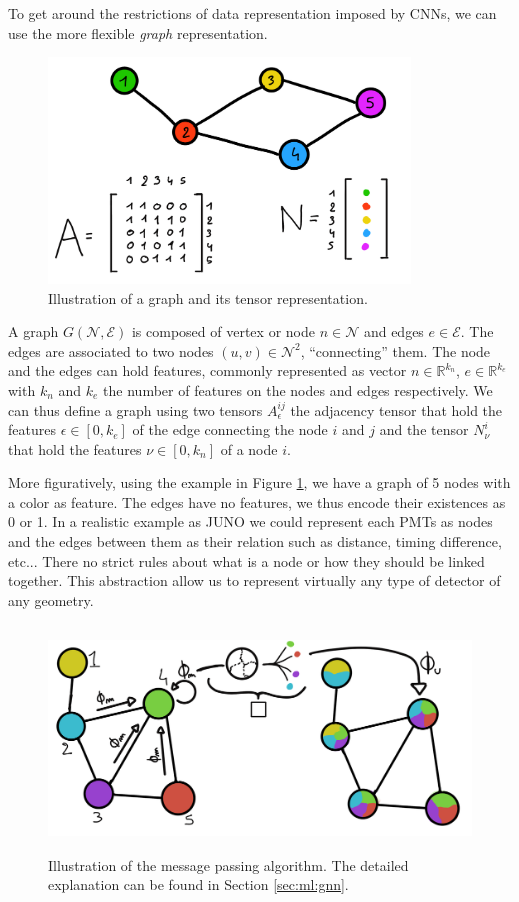 \documentclass[../main.tex]{subfiles}
\begin{document}
To get around the restrictions of data representation imposed by CNNs, we can use the more flexible \textit{graph} representation.
\begin{figure}[ht]
  \centering
  \includegraphics[height=6cm]{images/ml/graph_illustration.png}
  \caption{Illustration of a graph and its tensor representation.}
  \label{fig:ml:gnn:graph}
\end{figure}
A graph $G(\mathcal{N},\mathcal{E})$ is composed of vertex or node $n \in \mathcal{N}$ and edges $e \in \mathcal{E}$. The edges are associated to two nodes $(u, v) \in \mathcal{N}^2$, ``connecting'' them. The node and the edges can hold features, commonly represented as vector $n \in \mathbb{R}^{k_{n}}$, $e \in \mathbb{R}^{k_{e}}$ with $k_n$ and $k_e$ the number of features on the nodes and edges respectively. We can thus define a graph using two tensors $A^{ij}_{\epsilon}$ the adjacency tensor that hold the features $\epsilon \in [0, k_e]$ of the edge connecting the node $i$ and $j$ and the tensor $N^{i}_{\nu}$ that hold the features $\nu \in [0, k_n]$ of a node $i$.

More figuratively, using the example in Figure \ref{fig:ml:gnn:graph}, we have a graph of 5 nodes with a color as feature. The edges have no features, we thus encode their existences as 0 or 1. In a realistic example as JUNO we could represent each PMTs as nodes and the edges between them as their relation such as distance, timing difference, etc... There no strict rules about what is a node or how they should be linked together. This abstraction allow us to represent virtually any type of detector of any geometry.

\begin{figure}[ht]
  \centering
  \includegraphics[height=6cm]{images/ml/message_passing.png}
  \caption{Illustration of the message passing algorithm. The detailed explanation can be found in Section \ref{sec:ml:gnn}.}
  \label{fig:ml:gnn:message_passing}
\end{figure}
\end{document}
